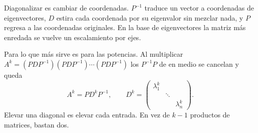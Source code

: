 \documentclass[11pt,letterpaper]{article}
\begin{document}
\begin{idea}
    Diagonalizar es cambiar de coordenadas. $P^{-1}$ traduce un vector
    a coordenadas de eigenvectores, $D$ estira cada coordenada por su
    eigenvalor sin mezclar nada, y $P$ regresa a las coordenadas
    originales. En la base de eigenvectores la matriz más enredada se
    vuelve un escalamiento por ejes.
\end{idea}

Para lo que más sirve es para las potencias. Al multiplicar
$A^k = (PDP^{-1})(PDP^{-1}) \cdots (PDP^{-1})$ los $P^{-1}P$ de en
medio se cancelan y queda
\[
    A^k = P D^k P^{-1} ,
    \qquad
    D^k = \begin{pmatrix} \lambda_1^k & & \\ & \ddots & \\
                          & & \lambda_n^k \end{pmatrix} .
\]
Elevar una diagonal es elevar cada entrada. En vez de $k - 1$
productos de matrices, bastan dos.
\end{document}
